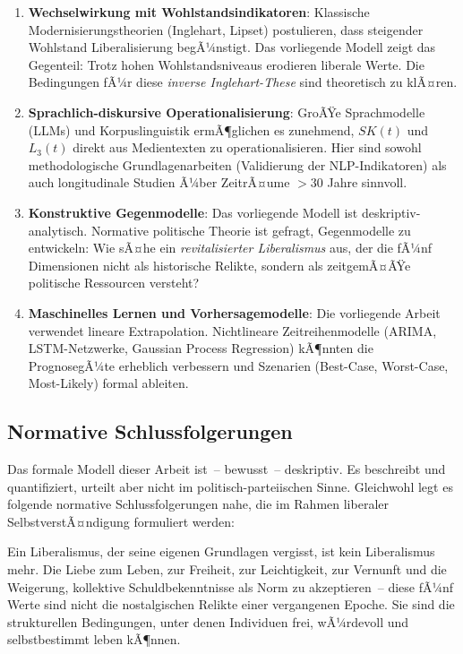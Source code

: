 ﻿\documentclass[a4paper,12pt]{article}
\theoremstyle{definition}
\begin{document}
\begin{enumerate}
	\item \textbf{Wechselwirkung mit Wohlstandsindikatoren}: Klassische Modernisierungstheorien (Inglehart, Lipset) postulieren, dass steigender Wohlstand Liberalisierung begÃ¼nstigt. Das vorliegende Modell zeigt das Gegenteil: Trotz hohen Wohlstandsniveaus erodieren liberale Werte. Die Bedingungen fÃ¼r diese \emph{inverse Inglehart-These} sind theoretisch zu klÃ¤ren.
	
	\item \textbf{Sprachlich-diskursive Operationalisierung}: GroÃŸe Sprachmodelle (LLMs) und Korpuslinguistik ermÃ¶glichen es zunehmend, $SK(t)$ und $L_3(t)$ direkt aus Medientexten zu operationalisieren. Hier sind sowohl methodologische Grundlagenarbeiten (Validierung der NLP-Indikatoren) als auch longitudinale Studien Ã¼ber ZeitrÃ¤ume $>30$ Jahre sinnvoll.
	
	\item \textbf{Konstruktive Gegenmodelle}: Das vorliegende Modell ist deskriptiv-analytisch. Normative politische Theorie ist gefragt, Gegenmodelle zu entwickeln: Wie sÃ¤he ein \emph{revitalisierter Liberalismus} aus, der die fÃ¼nf Dimensionen nicht als historische Relikte, sondern als zeitgemÃ¤ÃŸe politische Ressourcen versteht?
	
	\item \textbf{Maschinelles Lernen und Vorhersagemodelle}: Die vorliegende Arbeit verwendet lineare Extrapolation. Nichtlineare Zeitreihenmodelle (ARIMA, LSTM-Netzwerke, Gaussian Process Regression) kÃ¶nnten die PrognosegÃ¼te erheblich verbessern und Szenarien (Best-Case, Worst-Case, Most-Likely) formal ableiten.
\end{enumerate}

\subsection{Normative Schlussfolgerungen}

Das formale Modell dieser Arbeit ist~-- bewusst~-- deskriptiv. Es beschreibt und quantifiziert, urteilt aber nicht im politisch-parteiischen Sinne. Gleichwohl legt es folgende normative Schlussfolgerungen nahe, die im Rahmen liberaler SelbstverstÃ¤ndigung formuliert werden:

Ein Liberalismus, der seine eigenen Grundlagen vergisst, ist kein Liberalismus mehr. Die Liebe zum Leben, zur Freiheit, zur Leichtigkeit, zur Vernunft und die Weigerung, kollektive Schuldbekenntnisse als Norm zu akzeptieren~-- diese fÃ¼nf Werte sind nicht die nostalgischen Relikte einer vergangenen Epoche. Sie sind die strukturellen Bedingungen, unter denen Individuen frei, wÃ¼rdevoll und selbstbestimmt leben kÃ¶nnen.
\end{document}

